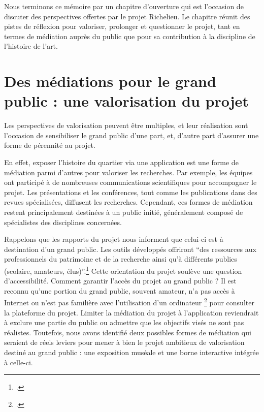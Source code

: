 
Nous terminons ce mémoire par un chapitre d'ouverture qui est l'occasion de discuter des perspectives offertes par le projet Richelieu. Le chapitre réunit des pistes de réflexion pour valoriser, prolonger et questionner le projet, tant en termes de médiation auprès du public que pour sa contribution à la discipline de l'histoire de l'art.

\section{Des médiations pour le grand public : une valorisation du projet}
Les perspectives de valorisation peuvent être multiples, et leur réalisation sont  l'occasion de sensibiliser le grand public d'une part, et, d'autre part d'assurer une forme de pérennité au projet.

En effet, exposer l'histoire du quartier via une application est une forme de médiation parmi d'autres pour valoriser les recherches. Par exemple, les équipes ont participé à de nombreuses communications scientifiques pour accompagner le projet. Les présentations et les conférences, tout comme les publications dans des revues spécialisées, diffusent les recherches. Cependant, ces formes de médiation restent principalement destinées à un public initié, généralement composé de spécialistes des disciplines concernées.

Rappelons que les rapports du projet nous informent que celui-ci est à destination d'un grand public. Les outils développés offriront \enquote{des ressources aux professionnels du patrimoine et de la recherche ainsi qu'à différents publics (scolaire, amateurs, élus)}.\footcite{BADULESCUpublics2023} Cette orientation du projet soulève une question d'accessibilité. Comment garantir l'accès du projet au grand public ? Il est reconnu qu'une portion du grand public, souvent amateur, n'a pas accès à Internet ou n'est pas familière avec l'utilisation d'un ordinateur \footcite{GRADOZfracture2019} pour consulter la plateforme du projet. Limiter la médiation du projet à l'application reviendrait à exclure une partie du public ou admettre que les objectifs visés ne sont pas réalistes. Toutefois, nous avons identifié deux possibles formes de médiation qui seraient de réels leviers pour mener à bien le projet ambitieux de valorisation destiné au grand public : une exposition muséale et une borne interactive intégrée à celle-ci.

